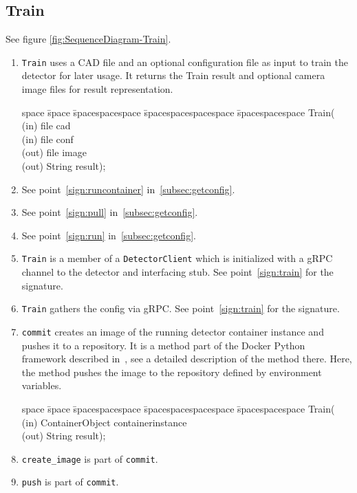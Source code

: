 \subsection{Train}
See figure \ref{fig:SequenceDiagram-Train}.
\begin{enumerate}
    \item \texttt{Train} uses a CAD file and an optional configuration file as input to train the detector for later usage. It returns the Train result and optional camera image files for result representation.
        \begin{tabbing}
        space \= space \= spacespacespace \= spacespacespacespace \= spacespacespace \kill
        \>  Train(\\
        \>  \>  (in)	 \> 	file          \> cad\\
        \>  \>  (in)	 \> 	file          \> conf\\
        \>  \>  (out)	 \> 	file          \> image\\
        \>  \>  (out)	 \> 	String           \> result); 
        \end{tabbing}\label{sign:train}
    \item See point~\ref{sign:runcontainer} in~\ref{subsec:getconfig}.
    \item See point~\ref{sign:pull} in~\ref{subsec:getconfig}.
    \item See point~\ref{sign:run} in~\ref{subsec:getconfig}.
    \item \texttt{Train} is a member of a \texttt{DetectorClient} which is initialized with a gRPC channel to the detector and interfacing stub. See point~\ref{sign:train} for the signature.
    \item \texttt{Train} gathers the config via gRPC. See point~\ref{sign:train} for the signature.
    \item \texttt{commit} creates an image of the running detector container instance and pushes it to a repository. It is a method part of the Docker Python framework described in~\cite{N.A.Docker2019}, see a detailed description of the method there. Here, the method pushes the image to the repository defined by environment variables.
    \begin{tabbing}
    space \= space \= spacespacespace \= spacespacespacespace \= spacespacespace \kill
    \>  Train(\\
    \>  \>  (in)	 \> 	ContainerObject          \> containerinstance\\
    \>  \>  (out)	 \> 	String           \> result); 
    \end{tabbing}\label{sign:commit}
    \item \texttt{create_image} is part of \texttt{commit}.
    \item \texttt{push} is part of \texttt{commit}.
\end{enumerate}


